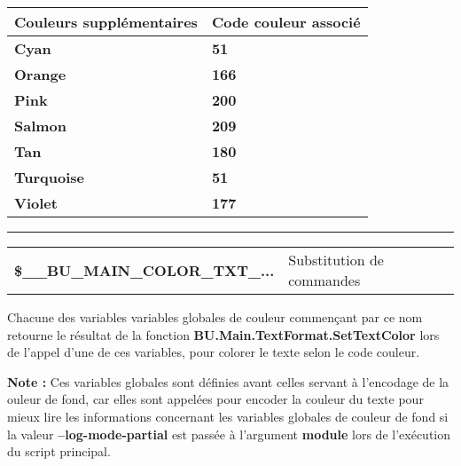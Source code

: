 \documentclass[a4paper,10pt]{article}
\begin{document}
\begin{justify}
        \begin{tabular}{|l|l|}
            \hline
            \textbf{Couleurs supplémentaires} & \textbf{Code couleur associé}\\
            \hline
            \textbf{\color{Cyan}Cyan} & \textbf{\color{Cyan}51}\\
            \hline
            \textbf{\color{Orange}Orange} & \textbf{\color{Orange}166}\\
            \hline
            \textbf{\color{Pink}Pink} & \textbf{\color{Pink}200}\\
            \hline
            \textbf{\color{Salmon}Salmon} & \textbf{\color{Salmon}209}\\
            \hline
            \textbf{\color{Tan}Tan} & \textbf{\color{Tan}180}\\
            \hline
            \textbf{\color{Turquoise}Turquoise} & \textbf{\color{Turquoise}51}\\
            \hline
            \textbf{\color{Violet}Violet} & \textbf{\color{Violet}177}\\
            \hline
        \end{tabular}
    \end{justify}

    \setlength{\parskip}{2em}


    \par\noindent\rule{\textwidth}{0.4pt}

    \setlength{\parskip}{1em}

    \begin{justify}
        \begin{tabular}{l|l}
            \textbf{\color{vars}\$\_\_BU\_MAIN\_COLOR\_TXT\_...} & Substitution de commandes\\
        \end{tabular}
    \end{justify}

    \begin{justify}
        Chacune des variables variables globales de couleur commençant par ce nom retourne le résultat de la fonction \textbf{\color{func}BU.Main.TextFormat.SetTextColor} lors de l'appel d'une de ces variables, pour colorer le texte selon le code couleur.
    \end{justify}

    \begin{justify}
        \textbf{Note :} Ces variables globales sont définies avant celles servant à l'encodage de la ouleur de fond, car elles sont appelées pour encoder la couleur du texte pour mieux lire les informations concernant les variables globales de couleur de fond si la valeur \textbf{--log-mode-partial} est passée à l'argument \textbf{module} lors de l'exécution du script principal.
    \end{justify}
\end{document}
